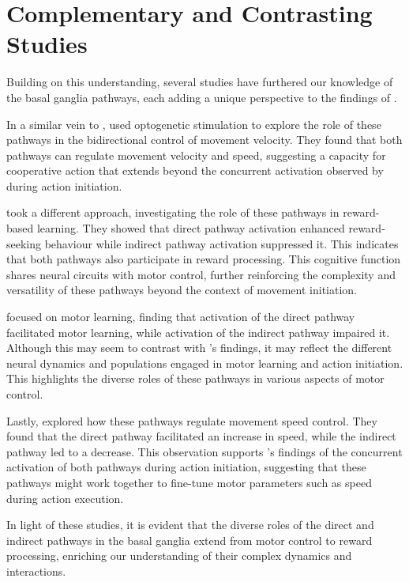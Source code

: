 \documentclass[10pt]{article}
\begin{document}
\begin{sloppypar}
  \section{Complementary and Contrasting Studies}
  \label{sec:complementary-and-contrasting-studies}

  Building on this understanding, several studies have furthered our knowledge of the basal ganglia pathways, each adding a unique perspective to the findings of \cite{cui_concurrent_2013}.

  In a similar vein to \citeauthor{cui_concurrent_2013}, \cite{yttri_opponent_2016} used optogenetic stimulation to explore the role of these pathways in the bidirectional control of movement velocity. They found that both pathways can regulate movement velocity and speed, suggesting a capacity for cooperative action that extends beyond the concurrent activation observed by \citeauthor{cui_concurrent_2013} during action initiation.

  \cite{guillaumin_experimental_2021} took a different approach, investigating the role of these pathways in reward-based learning. They showed that direct pathway activation enhanced reward-seeking behaviour while indirect pathway activation suppressed it. This indicates that both pathways also participate in reward processing. This cognitive function shares neural circuits with motor control, further reinforcing the complexity and versatility of these pathways beyond the context of movement initiation.

  \cite{hilt_evidence_2016} focused on motor learning, finding that activation of the direct pathway facilitated motor learning, while activation of the indirect pathway impaired it. Although this may seem to contrast with \cite{cui_concurrent_2013}’s findings, it may reflect the different neural dynamics and populations engaged in motor learning and action initiation. This highlights the diverse roles of these pathways in various aspects of motor control.

  Lastly, \cite{wang_direct_2015} explored how these pathways regulate movement speed control. They found that the direct pathway facilitated an increase in speed, while the indirect pathway led to a decrease. This observation supports \cite{cui_concurrent_2013}’s findings of the concurrent activation of both pathways during action initiation, suggesting that these pathways might work together to fine-tune motor parameters such as speed during action execution.

  In light of these studies, it is evident that the diverse roles of the direct and indirect pathways in the basal ganglia extend from motor control to reward processing, enriching our understanding of their complex dynamics and interactions.


\end{sloppypar}
\end{document}
